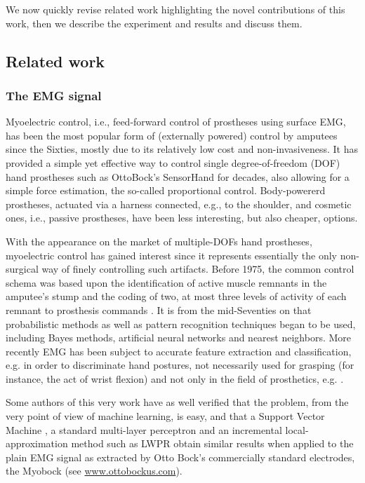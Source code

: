 We now quickly revise related work highlighting the novel contributions of this
work, then we describe the experiment and results and discuss them.

\subsection{Related work}

\subsubsection{The EMG signal}

Myoelectric control, i.e., feed-forward control of prostheses using surface EMG,
has been the most popular form of (externally powered) control by amputees since
the Sixties, mostly due to its relatively low cost and non-invasiveness. It has
provided a simple yet effective way to control single degree-of-freedom (DOF) hand
prostheses such as OttoBock's SensorHand for decades, also allowing for a simple
force estimation, the so-called proportional control. Body-powererd prostheses,
actuated via a harness connected, e.g., to the shoulder, and cosmetic ones, i.e.,
passive prostheses, have been less interesting, but also cheaper, options.

With the appearance on the market of multiple-DOFs hand prostheses, myoelectric
control has gained interest since it represents essentially the only non-surgical
way of finely controlling such artifacts. Before 1975, the common
control schema was based upon the identification of active muscle remnants in the
amputee's stump and the coding of two, at most three levels of activity of each
remnant to prosthesis commands \cite{bottomley65,childress69}. It is from the mid-Seventies
on that probabilistic methods as well as pattern recognition techniques began to be used,
including Bayes methods, artificial neural networks and nearest neighbors. More recently
EMG has been subject to accurate feature extraction and classification,
e.g. \cite{englehart01,dunlop,smagt06} in order to discriminate hand postures, not necessarily
used for grasping (for instance, the act of wrist flexion) and not only in the field
of prosthetics, e.g. \cite{fukuda,yokoi}.

Some authors of this very work \cite{2008.ICRA,2008.BioCyb} have as well verified that the problem, from
the very point of view of machine learning, is easy, and that a Support Vector Machine
\cite{BGV92}, a standard multi-layer perceptron and an incremental local-approximation
method such as LWPR \cite{lwpr} obtain similar results when applied to the plain EMG
signal as extracted by Otto Bock's commercially standard electrodes, the Myobock
(see \url{www.ottobockus.com}).

